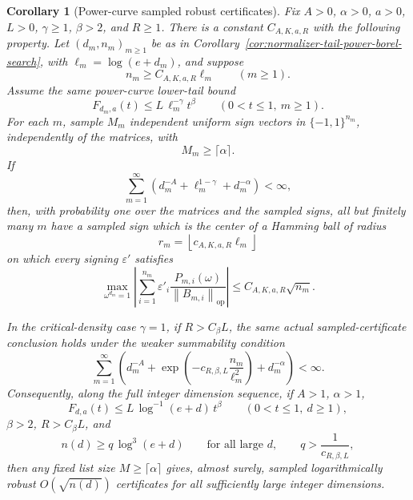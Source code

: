 \documentclass[11pt]{amsart}
\numberwithin{equation}{section}
\newtheorem{corollary}[theorem]{Corollary}
\theoremstyle{definition}
\theoremstyle{remark}
\newcommand{\op}{\mathrm{op}}
\newcommand{\norm}[1]{\left\lVert #1\right\rVert}
\newcommand{\eps}{\varepsilon}
\begin{document}
\begin{corollary}[Power-curve sampled robust certificates]
\label{cor:normalizer-tail-power-borel-sampled}
Fix \(A>0\), \(\alpha>0\), \(a>0\), \(L>0\), \(\gamma\ge1\), \(\beta>2\), and
\(R\ge1\).  There is a constant \(C_{A,K,a,R}\) with the following property.
Let \((d_m,n_m)_{m\ge1}\) be as in
Corollary~\ref{cor:normalizer-tail-power-borel-search}, with
\(\ell_m=\log(e+d_m)\), and suppose
\[
  n_m\ge C_{A,K,a,R}\ell_m\qquad(m\ge1).
\]
Assume the same power-curve lower-tail bound
\[
  F_{d_m,a}(t)\le L\,\ell_m^{-\gamma}t^\beta
  \qquad(0<t\le1,\ m\ge1).
\]
For each \(m\), sample \(M_m\) independent uniform sign vectors in
\(\{-1,1\}^{n_m}\), independently of the matrices, with
\[
  M_m\ge\lceil\alpha\rceil .
\]
If
\[
  \sum_{m=1}^{\infty}
  \left(d_m^{-A}+\ell_m^{1-\gamma}+d_m^{-\alpha}\right)<\infty,
\]
then, with probability one over the matrices and the sampled signs, all but
finitely many \(m\) have a sampled sign which is the center of a Hamming ball of
radius
\[
  r_m=\left\lfloor c_{A,K,a,R}\ell_m\right\rfloor
\]
on which every signing \(\eps'\) satisfies
\[
  \max_{\omega^{d_m}=1}\left|\sum_{i=1}^{n_m}
  \eps'_i\frac{P_{m,i}(\omega)}{\norm{B_{m,i}}_{\op}}\right|
  \le C_{A,K,a,R}\sqrt{n_m}.
\]

In the critical-density case \(\gamma=1\), if \(R>C_\beta L\), the same actual
sampled-certificate conclusion holds under the weaker summability condition
\[
  \sum_{m=1}^{\infty}
  \left(d_m^{-A}
  +\exp\left(-c_{R,\beta,L}\frac{n_m}{\ell_m^2}\right)
  +d_m^{-\alpha}\right)<\infty .
\]
Consequently, along the full integer dimension sequence, if \(A>1\),
\(\alpha>1\),
\[
  F_{d,a}(t)\le L\,\log^{-1}(e+d)\,t^\beta
  \qquad(0<t\le1,\ d\ge1),
\]
\(\beta>2\), \(R>C_\beta L\), and
\[
  n(d)\ge q\,\log^3(e+d)
  \qquad\text{for all large }d,\qquad
  q>\frac1{c_{R,\beta,L}},
\]
then any fixed list size \(M\ge\lceil\alpha\rceil\) gives, almost surely,
sampled logarithmically robust \(O(\sqrt{n(d)})\) certificates for all
sufficiently large integer dimensions.
\end{corollary}
\end{document}
